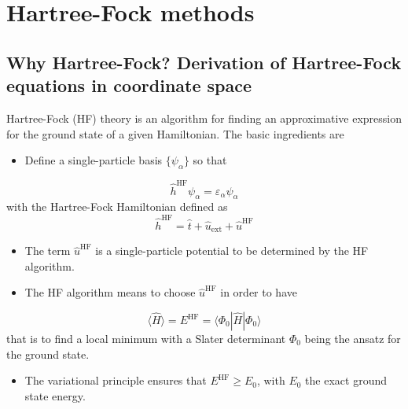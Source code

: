 \documentclass[%
oneside,                 %
final,                   %
10pt]{article}
\begin{document}

\newcommand{\exercisesection}[1]{\subsection*{#1}}



\section*{Hartree-Fock methods}

\subsection*{Why Hartree-Fock? Derivation of Hartree-Fock equations in coordinate space}

Hartree-Fock (HF) theory is an algorithm for finding an approximative expression for the ground state of a given Hamiltonian. The basic ingredients are
\begin{itemize}
  \item Define a single-particle basis $\{\psi_{\alpha}\}$ so that
\end{itemize}

\noindent
\[ 
\hat{h}^{\mathrm{HF}}\psi_{\alpha} = \varepsilon_{\alpha}\psi_{\alpha}
\]
with the Hartree-Fock Hamiltonian defined as
\[
\hat{h}^{\mathrm{HF}}=\hat{t}+\hat{u}_{\mathrm{ext}}+\hat{u}^{\mathrm{HF}}
\]
\begin{itemize}
  \item The term  $\hat{u}^{\mathrm{HF}}$ is a single-particle potential to be determined by the HF algorithm.

  \item The HF algorithm means to choose $\hat{u}^{\mathrm{HF}}$ in order to have 
\end{itemize}

\noindent
\[ \langle \hat{H} \rangle = E^{\mathrm{HF}}= \langle \Phi_0 | \hat{H}|\Phi_0 \rangle
\]
that is to find a local minimum with a Slater determinant $\Phi_0$ being the ansatz for the ground state. 
\begin{itemize}
  \item The variational principle ensures that $E^{\mathrm{HF}} \ge E_0$, with $E_0$ the exact ground state energy.
\end{itemize}
\end{document}
